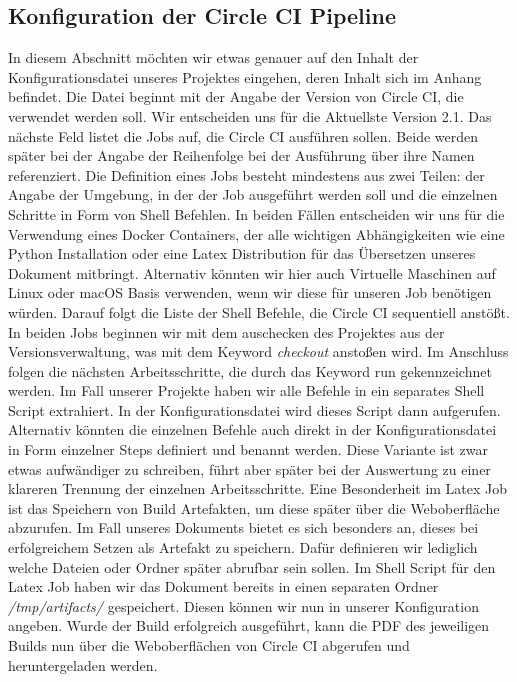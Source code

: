 \documentclass[11pt]{article}
\begin{document}
\subsection{Konfiguration der Circle CI Pipeline}
In diesem Abschnitt möchten wir etwas genauer auf den Inhalt der Konfigurationsdatei unseres Projektes eingehen, deren Inhalt sich im Anhang befindet. Die Datei beginnt mit der Angabe der Version von Circle CI, die verwendet werden soll. Wir entscheiden uns für die Aktuellste Version 2.1. Das nächste Feld listet die Jobs auf, die Circle CI ausführen sollen. Beide werden später bei der Angabe der Reihenfolge bei der Ausführung über ihre Namen referenziert. Die Definition eines Jobs besteht mindestens aus zwei Teilen: der Angabe der Umgebung, in der der Job ausgeführt werden soll und die einzelnen Schritte in Form von Shell Befehlen. In beiden Fällen entscheiden wir uns für die Verwendung eines Docker Containers, der alle wichtigen Abhängigkeiten wie eine Python Installation oder eine Latex Distribution für das Übersetzen unseres Dokument mitbringt. Alternativ könnten wir hier auch Virtuelle Maschinen auf Linux oder macOS Basis verwenden, wenn wir diese für unseren Job benötigen würden.
Darauf folgt die Liste der Shell Befehle, die Circle CI sequentiell anstößt. In beiden Jobs beginnen wir mit dem auschecken des Projektes aus der Versionsverwaltung, was mit dem Keyword \textit{checkout} anstoßen wird. Im Anschluss folgen die nächsten Arbeitsschritte, die durch das Keyword run gekennzeichnet werden. Im Fall unserer Projekte haben wir alle Befehle in ein separates Shell Script extrahiert. In der Konfigurationsdatei wird dieses Script dann aufgerufen. Alternativ könnten die einzelnen Befehle auch direkt in der Konfigurationsdatei in Form einzelner Steps definiert und benannt werden. Diese Variante ist zwar etwas aufwändiger zu schreiben, führt aber später bei der Auswertung zu einer klareren Trennung der einzelnen Arbeitsschritte.
Eine Besonderheit im Latex Job ist das Speichern von Build Artefakten, um diese später über die Weboberfläche abzurufen. Im Fall unseres Dokuments bietet es sich besonders an, dieses bei erfolgreichem Setzen als Artefakt zu speichern. Dafür definieren wir lediglich welche Dateien oder Ordner später abrufbar sein sollen. Im Shell Script für den Latex Job haben wir das Dokument bereits in einen separaten Ordner \textit{/tmp/artifacts/} gespeichert. Diesen können wir nun in unserer Konfiguration angeben. Wurde der Build erfolgreich ausgeführt, kann die PDF des jeweiligen Builds nun über die Weboberflächen von Circle CI abgerufen und heruntergeladen werden.
\end{document}
